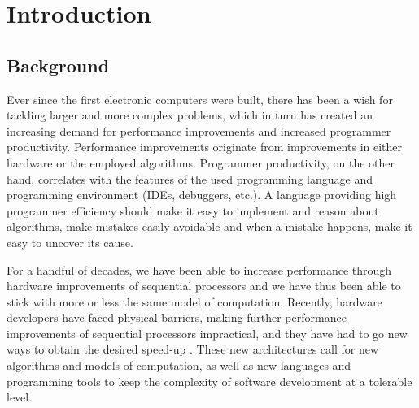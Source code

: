 
\chapter{Introduction}
\section{Background}
Ever since the first electronic computers were built, there has been a
wish for tackling larger and more complex problems, which in turn has
created an increasing demand for performance improvements and
increased programmer productivity. Performance improvements originate
from improvements in either hardware or the employed
algorithms. Programmer productivity, on the other hand, correlates
with the features of the used programming language and programming
environment (IDEs, debuggers, etc.). A language providing high
programmer efficiency should make it easy to implement and reason
about algorithms, make mistakes easily avoidable and when a mistake
happens, make it easy to uncover its cause.

For a handful of decades, we have been able to increase performance
through hardware improvements of sequential processors and we have
thus been able to stick with more or less the same model of
computation. Recently, hardware developers have faced physical
barriers, making further performance improvements of sequential
processors impractical, and they have had to go new ways to obtain the
desired speed-up \cite{sutter2006freelunchisover}. These new
architectures call for new algorithms and models of computation, as
well as new languages and programming tools to keep the complexity of
software development at a tolerable level.


